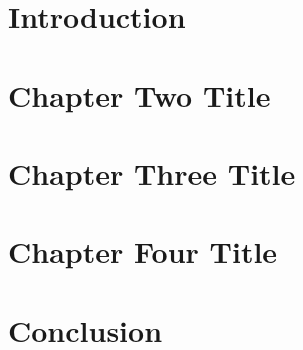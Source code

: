 \documentclass[11pt]{book}
\begin{document}
\mainmatter

\chapter{Introduction}



\chapter{Chapter Two Title}


 
\chapter{Chapter Three Title}


 
\chapter{Chapter Four Title}


 
\chapter{Conclusion}


\singlespacing



\end{document}
